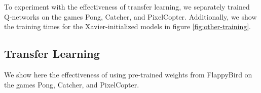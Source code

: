 \documentclass{article}
\begin{document}
To experiment with the effectiveness of transfer learning, we separately trained Q-networks on the games Pong, Catcher, and PixelCopter.
Additionally, we show the training times for the Xavier-initialized models in figure \ref{fig:other-training}.

\subsection{Transfer Learning}
We show here the effectiveness of using pre-trained weights from FlappyBird on the games Pong, Catcher, and PixelCopter.



\end{document}
